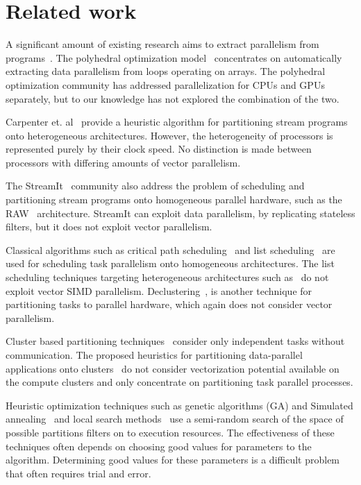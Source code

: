 \section{Related work}
\label{sec:related-work}

A significant amount of existing research aims to extract parallelism
from programs~\cite{mgri98,mgor06,gsih93}. The
polyhedral optimization model~\cite{mgri98} concentrates on
automatically extracting data parallelism from loops operating on
arrays. The polyhedral optimization community has addressed
parallelization for CPUs and GPUs separately, but to our knowledge has
not explored the combination of the two.

Carpenter et. al~\cite{pcar09} provide a heuristic algorithm for
partitioning stream programs onto heterogeneous architectures.
However, the heterogeneity of processors is represented purely by
their clock speed. No distinction is made between processors with
differing amounts of vector parallelism.

The StreamIt~\cite{Thies2009} community also address the problem of
scheduling and partitioning stream programs onto homogeneous parallel
hardware, such as the RAW~\cite{ewai97} architecture. StreamIt can
exploit data parallelism, by replicating stateless filters, but it
does not exploit vector parallelism.

Classical algorithms such as critical path
scheduling~\cite{Kohler1975} and list scheduling~\cite{atho74}
are used for scheduling task parallelism onto homogeneous
architectures. The list scheduling techniques targeting heterogeneous
architectures such as~\cite{htop02} do not exploit vector SIMD
parallelism. Declustering~\cite{gsih93}, is another technique for
partitioning tasks to parallel hardware, which again does not consider
vector parallelism.

Cluster based partitioning techniques~\cite{adou04}
consider only independent tasks without communication. The proposed
heuristics for partitioning data-parallel applications onto
clusters~\cite{ssan05,skum02} do not consider vectorization potential
available on the compute clusters and only concentrate on partitioning
task parallel processes.

Heuristic optimization techniques such as genetic algorithms
(GA) and Simulated annealing~\cite{265940,shroff1996genetic} and local search
methods~\cite{622584} use a semi-random search of the space of possible
partitions filters on to execution resources. The effectiveness of these
techniques often depends on choosing good values for parameters to the
algorithm. Determining good values for these parameters is a difficult problem
that often requires trial and error.

